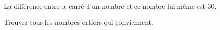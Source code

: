 %
%
    \og La différence entre le carré d'un nombre et ce nombre lui-même est \(30\).\fg

    Trouvez tous les nombres entiers qui conviennent.
